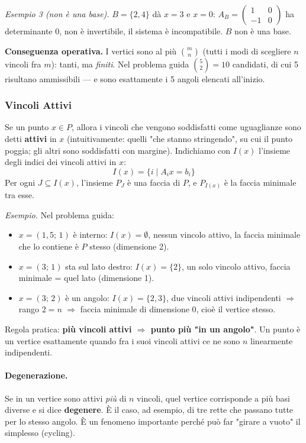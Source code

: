 \documentclass[12pt]{extarticle} %
\begin{document}
\noindent\textit{Esempio 3 (non è una base).} $B=\{2,4\}$ dà $x=3$ e $x=0$:
$A_B=\left(\begin{smallmatrix} 1 & 0 \\ -1 & 0\end{smallmatrix}\right)$ ha determinante $0$, non è invertibile, il sistema è incompatibile. $B$ non è una base.

\medskip
\noindent\textbf{Conseguenza operativa.} I vertici sono al più $\binom{m}{n}$ (tutti i modi di scegliere $n$ vincoli fra $m$): tanti, ma \emph{finiti}. Nel problema guida $\binom{5}{2}=10$ candidati, di cui 5 risultano ammissibili --- e sono esattamente i 5 angoli elencati all'inizio.

\subsubsection{Vincoli Attivi}
Se un punto $x \in P$, allora i vincoli che vengono soddisfatti come uguaglianze sono detti \textbf{attivi} in $x$ (intuitivamente: quelli "che stanno stringendo", su cui il punto poggia; gli altri sono soddisfatti con margine).
Indichiamo con $I(x)$ l'insieme degli indici dei vincoli attivi in $x$:
\[ I(x) = \{i \mid A_i x = b_i\} \]
Per ogni $J \subseteq I(x)$, l'insieme $P_J$ è una faccia di $P$, e $P_{I(x)}$ è la faccia minimale tra esse.

\noindent\textit{Esempio.} Nel problema guida:
\begin{itemize}
    \item $x=(1{,}5;\,1)$ è interno: $I(x)=\emptyset$, nessun vincolo attivo, la faccia minimale che lo contiene è $P$ stesso (dimensione 2).
    \item $x=(3;\,1)$ sta sul lato destro: $I(x)=\{2\}$, un solo vincolo attivo, faccia minimale = quel lato (dimensione 1).
    \item $x=(3;\,2)$ è un angolo: $I(x)=\{2,3\}$, due vincoli attivi indipendenti $\Rightarrow$ rango $2=n$ $\Rightarrow$ faccia minimale di dimensione 0, cioè il vertice stesso.
\end{itemize}
Regola pratica: \textbf{più vincoli attivi $\Rightarrow$ punto più "in un angolo"}. Un punto è un vertice esattamente quando fra i suoi vincoli attivi ce ne sono $n$ linearmente indipendenti.

\paragraph{Degenerazione.} Se in un vertice sono attivi \emph{più} di $n$ vincoli, quel vertice corrisponde a più basi diverse e si dice \textbf{degenere}. È il caso, ad esempio, di tre rette che passano tutte per lo stesso angolo. È un fenomeno importante perché può far "girare a vuoto" il simplesso (cycling).
\end{document}
